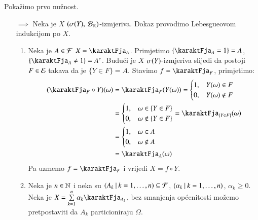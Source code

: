 \begin{rj}[\ref{zad:3.20}]
    Poka\v zimo prvo nu\v znost.
    \begin{itemize}
        \item[$\implies$]
        Neka je $X$ $({\sigma({Y})}, \: {\mathcal{B}_{\mathbb{R}}})$-izmjeriva.
        Dokaz provodimo Lebesgueovom indukcijom po $X$.
        \begin{enumerate}[label=(\arabic*. korak)]
            \item Neka je $A \in \mathcal{F}$ $X = \karaktFja_A$.
            Primjetimo $\{ \karaktFja_A = 1 \} = A$, $\{ \karaktFja_A \neq 1 \} = A^c$.
            Budu\' ci je $X$ $\sigma({Y})$-izmjeriva slijedi da postoji $F \in \mathcal{E}$ takava da je $\{Y \in F\} = A$.
            Stavimo $f = \karaktFja_F$, primjetimo:
            \begin{equation*}
                \begin{aligned}
                    (\karaktFja_F \circ Y)(\omega)
                    &= \karaktFja_F (Y(\omega))
                    =
                    \begin{cases}
                        1, &Y(\omega) \in F\\
                        0, &Y(\omega) \notin F 
                    \end{cases}\\
                    &=
                    \begin{cases}
                        1, &\omega \in \{Y \in F\}\\
                        0, &\omega \notin \{Y \in F\}
                    \end{cases}
                    = \karaktFja_{\{Y \in F\}} (\omega)\\
                    &=
                    \begin{cases}
                        1, &\omega \in A\\
                        0, &\omega \notin A
                    \end{cases}\\
                    &= \karaktFja_A (\omega)
                \end{aligned}
            \end{equation*}
            Pa uzmemo $f = \karaktFja_F$ i vrijedi $X = f \circ Y$.
            \item Neka je $n \in \mathbb{N}$ i neka su $({A_k} \: | \: {k = 1, \ldots, n}) \subseteq \mathcal{F}$, $({\alpha_k} \: | \: {k = 1, \ldots, n})$, $\alpha_k \geq 0$.
            Neka je $X = \suma{k = 1}{n} \alpha_k \karaktFja_{A_k}$, bez smanjenja op\' cenitosti mo\v zemo pretpostaviti da $A_k$ particioniraju $\Omega$.

\end{enumerate}
\end{itemize}
\end{rj}
